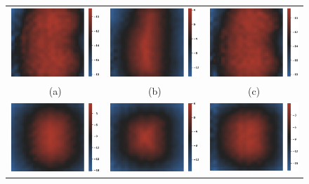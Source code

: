 \begin{figure}[!htbp]
  \centering
  \begin{tabular}{ccc}
    \includegraphics[width=.28\linewidth]{figures/spp/car_sdf_slices/x_0.eps}&
		\includegraphics[width=.28\linewidth]{figures/spp/car_sdf_slices/x_10.eps}&
		\includegraphics[width=.28\linewidth]{figures/spp/car_sdf_slices/x_19.eps}\\
    (a) & (b) & (c) \\
    \includegraphics[width=.28\linewidth]{figures/spp/car_sdf_slices/y_0.eps}&
		\includegraphics[width=.28\linewidth]{figures/spp/car_sdf_slices/y_10.eps}&
		\includegraphics[width=.28\linewidth]{figures/spp/car_sdf_slices/y_19.eps}\\

\end{tabular}
\end{figure}
